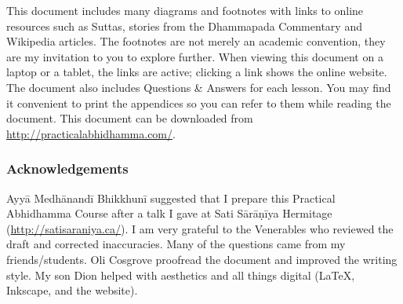 This document includes many diagrams and footnotes with links to online resources such as Suttas, stories from the Dhammapada Commentary and Wikipedia articles. The footnotes are not merely an academic convention, they are my invitation to you to explore further. When viewing this document on a laptop or a tablet, the links are active; clicking a link shows the online website. The document also includes Questions \& Answers for each lesson. You may find it convenient to print the appendices so you can refer to them while reading the document. This document can be downloaded from \url{http://practicalabhidhamma.com/}.

\subsubsection*{Acknowledgements}

Ayyā Medhānandī Bhikkhunī suggested that I prepare this Practical Abhidhamma Course after a talk I gave at Sati Sārāṇīya Hermitage (\url{http://satisaraniya.ca/}). I am very grateful to the Venerables who reviewed the draft and corrected inaccuracies. Many of the questions came from my friends/students. Oli Cosgrove proofread the document and improved the writing style. My son Dion helped with aesthetics and all things digital (\LaTeX, Inkscape, and the website).
